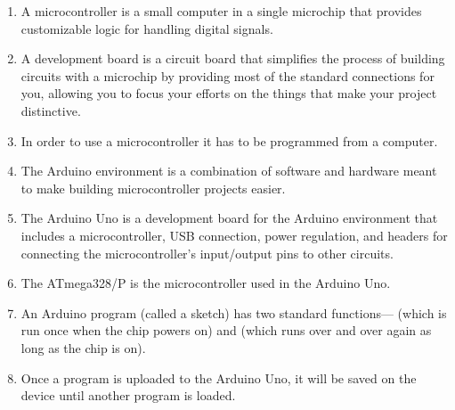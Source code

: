 \begin{enumerate}
\item A microcontroller is a small computer in a single microchip that provides customizable logic for handling digital signals.
\item A development board is a circuit board that simplifies the process of building circuits with a microchip by providing most of the standard connections for you, allowing you to focus your efforts on the things that make your project distinctive.
\item In order to use a microcontroller it has to be programmed from a computer.
\item The Arduino environment is a combination of software and hardware meant to make building microcontroller projects easier.
\item The Arduino Uno is a development board for the Arduino environment that includes a microcontroller, USB connection, power regulation, and headers for connecting the microcontroller's input/output pins to other circuits.
\item The ATmega328/P is the microcontroller used in the Arduino Uno.
\item An Arduino program (called a sketch) has two standard functions--- (which is run once when the chip powers on) and  (which runs over and over again as long as the chip is on).
\item Once a program is uploaded to the Arduino Uno, it will be saved on the device until another program is loaded.
\end{enumerate}

\applysection


